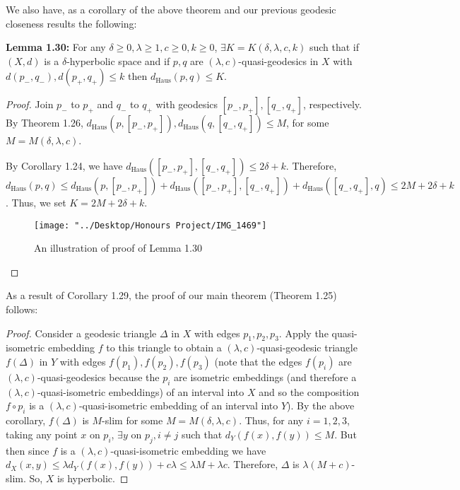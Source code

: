 \documentclass[12pt]{article}
\newcommand{\vs}{\vskip10pt}
\begin{document}
	We also have, as a corollary of the above theorem and our previous geodesic closeness results the following: 
	
	\vs 
	
	\textbf{Lemma 1.30: } For any $\delta \geq 0, \lambda \geq 1, c \geq 0, k \geq 0$, $\exists K = K(\delta, \lambda, c, k)$ such that if $(X,d)$ is a $\delta$-hyperbolic space and if $p,q$ are $(\lambda, c)$-quasi-geodesics in $X$ with $d(p_-, q_-), d(p_+, q_+) \leq k$ then $d_{\text{Haus}}(p,q) \leq K$. 
	
	\begin{proof}
		
		Join $p_-$ to $p_+$ and $q_-$ to $q_+$ with geodesics $[p_-, p_+], [q_-, q_+]$, respectively. By Theorem 1.26, $d_{\text{Haus}}(p, [p_-, p_+]), d_{\text{Haus}}(q, [q_-, q_+]) \leq M$, for some $M = M(\delta, \lambda, c)$.
		
		\vs
		 By Corollary 1.24, we have $d_{\text{Haus}}([p_-, p_+], [q_-, q_+]) \leq 2\delta + k$. Therefore, $d_{\text{Haus}}(p,q) \leq d_{\text{Haus}}(p, [p_-, p_+]) + d_{\text{Haus}}([p_-, p_+], [q_-, q_+]) + d_{\text{Haus}}([q_-, q_+], q) \leq 2M + 2\delta + k$. Thus, we set $K = 2M + 2\delta + k$.
		
		\begin{figure} [H]
			\centering
			\texttt{[image: "../Desktop/Honours Project/IMG\_1469"]}
			\caption{An illustration of proof of Lemma 1.30}
			\label{fig:img1469}
		\end{figure}
		
	\end{proof}

	As a result of Corollary 1.29, the proof of our main theorem (Theorem 1.25) follows: 
	
	\begin{proof}
		
		Consider a geodesic triangle $\Delta$ in $X$ with edges $p_1, p_2, p_3$. Apply the quasi-isometric embedding $f$ to this triangle to obtain a $(\lambda, c)$-quasi-geodesic triangle $f(\Delta)$ in $Y$ with edges $f(p_1), f(p_2), f(p_3)$ (note that the edges $f(p_i)$ are $(\lambda, c)$-quasi-geodesics because the $p_i$ are isometric embeddings (and therefore a $(\lambda, c)$-quasi-isometric embeddings) of an interval into $X$ and so the composition $f \circ p_i$ is a $(\lambda, c)$-quasi-isometric embedding of an interval into $Y$). By the above corollary, $f(\Delta)$ is $M$-slim for some $M = M(\delta, \lambda, c)$. Thus, for any $i = 1,2,3$, taking any point $x$ on $p_i$, $\exists y$ on $p_j, i \neq j$ such that $d_Y(f(x), f(y)) \leq M$. But then since $f$ is a $(\lambda, c)$-quasi-isometric embedding we have $d_X(x,y) \leq \lambda d_Y(f(x), f(y)) + c \lambda \leq \lambda M + \lambda c$. Therefore, $\Delta$ is $\lambda (M + c)$-slim. So, $X$ is hyperbolic. 
		
	\end{proof}
\end{document}
